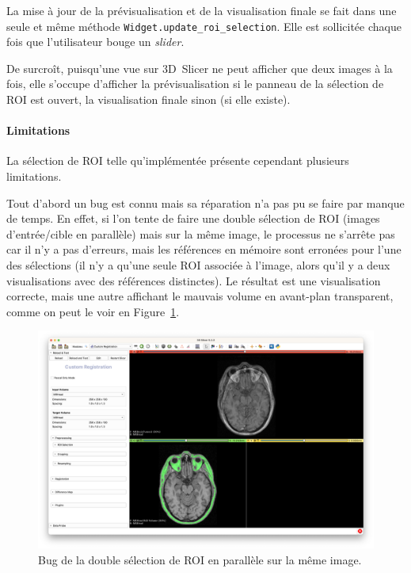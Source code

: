 \documentclass{article}
\newcommand{\subsubsubsection}[1]{\paragraph{#1}\par\noindent\bigskip}
\begin{document}
{{{{                \bigskip

                La mise à jour de la prévisualisation et de la visualisation finale se fait dans une seule et même méthode \texttt{Widget.update\_roi\_selection}. Elle est sollicitée chaque fois que l'utilisateur bouge un \textit{slider}.

                De surcroît, puisqu'une vue sur 3D~Slicer ne peut afficher que deux images à la fois, elle s'occupe d'afficher la prévisualisation si le panneau de la sélection de ROI est ouvert, la visualisation finale sinon (si elle existe).

                \newpage
            }

            {
                \subsubsubsection{Limitations}


                La sélection de ROI telle qu'implémentée présente cependant plusieurs limitations.

                \bigskip

                Tout d'abord un bug est connu mais sa réparation n'a pas pu se faire par manque de temps. En effet, si l'on tente de faire une double sélection de ROI (images d'entrée/cible en parallèle) mais sur la même image, le processus ne s'arrête pas car il n'y a pas d'erreurs, mais les références en mémoire sont erronées pour l'une des sélections (il n'y a qu'une seule ROI associée à l'image, alors qu'il y a deux visualisations avec des références distinctes). Le résultat est une visualisation correcte, mais une autre affichant le mauvais volume en avant-plan transparent, comme on peut le voir en Figure~\ref{fig:roi-selection-bug}.

                \begin{figure}[!ht]
                    \centering
                    \includegraphics[width=\textwidth]{images/roi-selection-bug.png}
                    \caption{Bug de la double sélection de ROI en parallèle sur la même image.}
                    \label{fig:roi-selection-bug}
                \end{figure}

}}}}
\end{document}
